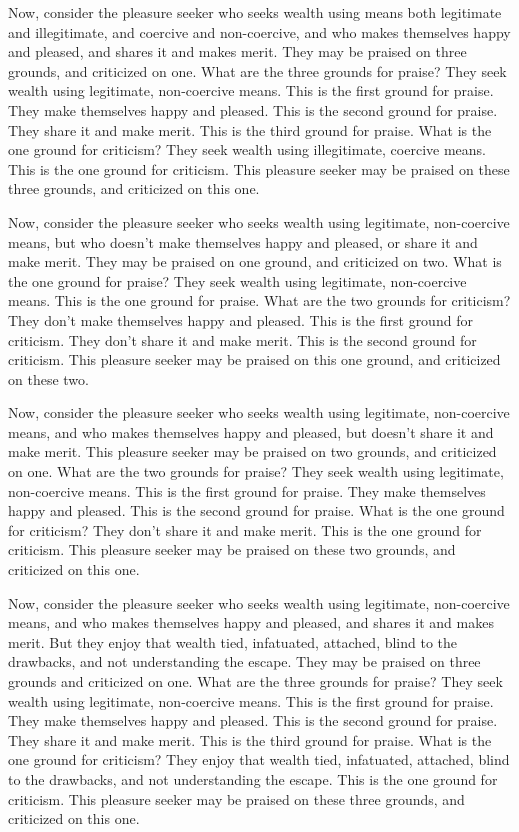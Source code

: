 \documentclass[12pt,openany]{book}%
\begin{document}
Now, consider the pleasure seeker who seeks wealth using means both legitimate and illegitimate, and coercive and non-coercive, and who makes themselves happy and pleased, and shares it and makes merit. They may be praised on three grounds, and criticized on one. What are the three grounds for praise? They seek wealth using legitimate, non-coercive means. This is the first ground for praise. They make themselves happy and pleased. This is the second ground for praise. They share it and make merit. This is the third ground for praise. What is the one ground for criticism? They seek wealth using illegitimate, coercive means. This is the one ground for criticism. This pleasure seeker may be praised on these three grounds, and criticized on this one. 

Now, consider the pleasure seeker who seeks wealth using legitimate, non-coercive means, but who doesn’t make themselves happy and pleased, or share it and make merit. They may be praised on one ground, and criticized on two. What is the one ground for praise? They seek wealth using legitimate, non-coercive means. This is the one ground for praise. What are the two grounds for criticism? They don’t make themselves happy and pleased. This is the first ground for criticism. They don’t share it and make merit. This is the second ground for criticism. This pleasure seeker may be praised on this one ground, and criticized on these two. 

Now, consider the pleasure seeker who seeks wealth using legitimate, non-coercive means, and who makes themselves happy and pleased, but doesn’t share it and make merit. This pleasure seeker may be praised on two grounds, and criticized on one. What are the two grounds for praise? They seek wealth using legitimate, non-coercive means. This is the first ground for praise. They make themselves happy and pleased. This is the second ground for praise. What is the one ground for criticism? They don’t share it and make merit. This is the one ground for criticism. This pleasure seeker may be praised on these two grounds, and criticized on this one. 

Now, consider the pleasure seeker who seeks wealth using legitimate, non-coercive means, and who makes themselves happy and pleased, and shares it and makes merit. But they enjoy that wealth tied, infatuated, attached, blind to the drawbacks, and not understanding the escape. They may be praised on three grounds and criticized on one. What are the three grounds for praise? They seek wealth using legitimate, non-coercive means. This is the first ground for praise. They make themselves happy and pleased. This is the second ground for praise. They share it and make merit. This is the third ground for praise. What is the one ground for criticism? They enjoy that wealth tied, infatuated, attached, blind to the drawbacks, and not understanding the escape. This is the one ground for criticism. This pleasure seeker may be praised on these three grounds, and criticized on this one. 
\end{document}
